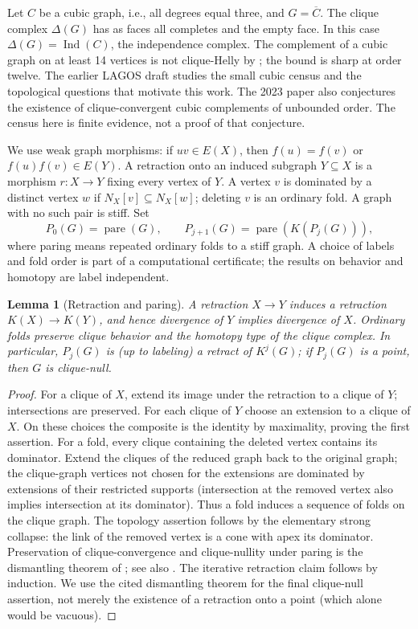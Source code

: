 \documentclass[11pt,a4paper]{article}
\newtheorem{lemma}[theorem]{Lemma}
\theoremstyle{definition}\newtheorem{definition}[theorem]{Definition}\newtheorem{example}[theorem]{Example}
\theoremstyle{remark}\newtheorem{remark}[theorem]{Remark}
\newcommand{\pare}{\operatorname{pare}}
\newcommand{\Ind}{\operatorname{Ind}}
\begin{document}
Let \(C\) be a cubic graph, i.e., all degrees equal three, and \(G=\overline C\). The clique complex \(\Delta(G)\) has as faces all completes and the empty face. In this case \(\Delta(G)=\Ind(C)\), the independence complex. The complement of a cubic graph on at least 14 vertices is not clique-Helly by \cite[Theorem 5.1]{regular}; the bound is sharp at order twelve. The earlier LAGOS draft \cite{lagos} studies the small cubic census and the topological questions that motivate this work. The 2023 paper also conjectures the existence of clique-convergent cubic complements of unbounded order. The census here is finite evidence, not a proof of that conjecture.

We use weak graph morphisms: if \(uv\in E(X)\), then \(f(u)=f(v)\) or \(f(u)f(v)\in E(Y)\). A retraction onto an induced subgraph \(Y\subseteq X\) is a morphism \(r:X\to Y\) fixing every vertex of \(Y\). A vertex \(v\) is dominated by a distinct vertex \(w\) if \(N_X[v]\subseteq N_X[w]\); deleting \(v\) is an ordinary fold. A graph with no such pair is stiff. Set
\[
 P_0(G)=\pare(G),\qquad P_{j+1}(G)=\pare(K(P_j(G))),
\]
where paring means repeated ordinary folds to a stiff graph. A choice of labels and fold order is part of a computational certificate; the results on behavior and homotopy are label independent.

\begin{lemma}[Retraction and paring]\label{lem:pare}
A retraction \(X\to Y\) induces a retraction \(K(X)\to K(Y)\), and hence divergence of \(Y\) implies divergence of \(X\). Ordinary folds preserve clique behavior and the homotopy type of the clique complex. In particular, \(P_j(G)\) is (up to labeling) a retract of \(K^j(G)\); if \(P_j(G)\) is a point, then \(G\) is clique-null.
\end{lemma}
\begin{proof}
For a clique of \(X\), extend its image under the retraction to a clique of \(Y\); intersections are preserved. For each clique of \(Y\) choose an extension to a clique of \(X\). On these choices the composite is the identity by maximality, proving the first assertion. For a fold, every clique containing the deleted vertex contains its dominator. Extend the cliques of the reduced graph back to the original graph; the clique-graph vertices not chosen for the extensions are dominated by extensions of their restricted supports (intersection at the removed vertex also implies intersection at its dominator). Thus a fold induces a sequence of folds on the clique graph. The topology assertion follows by the elementary strong collapse: the link of the removed vertex is a cone with apex its dominator. Preservation of clique-convergence and clique-nullity under paring is the dismantling theorem of \cite{dismantling}; see also \cite{contraction,collapses}. The iterative retraction claim follows by induction. We use the cited dismantling theorem for the final clique-null assertion, not merely the existence of a retraction onto a point (which alone would be vacuous).
\end{proof}
\end{document}
